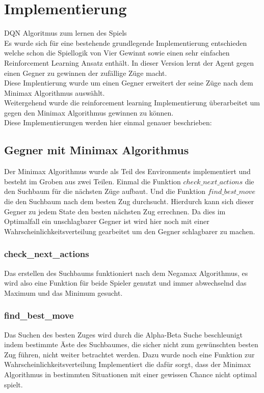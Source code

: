 \chapter{Implementierung}%

\label{cha:Implementierung}

\colorbox{red!30}{DQN Algoritmus zum lernen des Spiels}\\

Es wurde sich für eine bestehende grundlegende Implementierung entschieden welche schon die Spiellogik von Vier Gewinnt sowie einen sehr einfachen Reinforcement Learning Ansatz enthält. In dieser Version lernt der Agent gegen einen Gegner zu gewinnen der zufällige Züge macht.\\
Diese Implentierung wurde um einen Gegner erweitert der seine Züge nach dem Minimax Algorithmus auswählt.\\
Weitergehend wurde die reinforcement learning Implementierung überarbeitet um gegen den Minimax Algorithmus gewinnen zu können.\\
Diese Implementierungen werden hier einmal genauer beschrieben:\\

\section{Gegner mit Minimax Algorithmus}
Der Minimax Algorithmus wurde als Teil des Environments implementiert und besteht im Groben aus zwei Teilen. Einmal die Funktion $check\_next\_actions$ die den Suchbaum für die nächsten Züge aufbaut. Und die Funktion $find\_best\_move$ die den Suchbaum nach dem besten Zug durchsucht. Hierdurch kann sich dieser Gegner zu jedem State den besten nächsten Zug errechnen. Da dies im Optimalfall ein unschlagbarer Gegner ist wird hier noch mit einer Wahrscheinlichkeitsverteilung gearbeitet um den Gegner schlagbarer zu machen.

\subsection{check\_next\_actions}
Das erstellen des Suchbaums funktioniert nach dem Negamax Algorithmus, es wird also eine Funktion für beide Spieler genutzt und immer abwechselnd das Maximum und das Minimum gesucht.

\subsection{find\_best\_move}
Das Suchen des besten Zuges wird durch die Alpha-Beta Suche beschleunigt indem bestimmte Äste des Suchbaumes, die sicher nicht zum gewünschten besten Zug führen, nicht weiter betrachtet werden. Dazu wurde noch eine Funktion zur Wahrscheinlichkeitsverteilung Implementiert die dafür sorgt, dass der Minimax Algorithmus in bestimmten Situationen mit einer gewissen Chance nicht optimal spielt.

